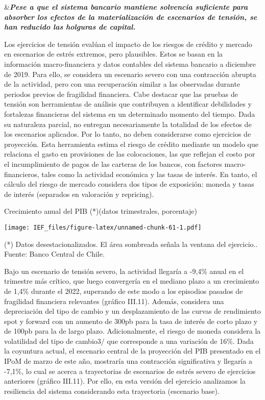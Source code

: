 \documentclass[
]{book}
\begin{document}
\&\textbf{\emph{Pese a que el sistema bancario mantiene solvencia suficiente para absorber los efectos de la materialización de escenarios de tensión, se han reducido las holguras de capital.}}

Los ejercicios de tensión evalúan el impacto de los riesgos de crédito y
mercado en escenarios de estrés extremos, pero plausibles. Estos se basan
en la información macro-financiera y datos contables del sistema bancario
a diciembre de 2019. Para ello, se considera un escenario severo con una
contracción abrupta de la actividad, pero con una recuperación similar a las
observadas durante periodos previos de fragilidad financiera.
Cabe destacar que las pruebas de tensión son herramientas de análisis que
contribuyen a identificar debilidades y fortalezas financieras del sistema en un
determinado momento del tiempo. Dada su naturaleza parcial, no entregan
necesariamente la totalidad de los efectos de los escenarios aplicados. Por lo
tanto, no deben considerarse como ejercicios de proyección. Esta herramienta
estima el riesgo de crédito mediante un modelo que relaciona el gasto en
provisiones de las colocaciones, las que reflejan el costo por el incumplimiento
de pagos de las carteras de los bancos, con factores macro-financieros, tales
como la actividad económica y las tasas de interés. En tanto, el cálculo del
riesgo de mercado considera dos tipos de exposición: moneda y tasas de interés
(separados en valoración y repricing).

Crecimiento anual del PIB (*)(datos trimestrales, porcentaje)

\texttt{[image: IEF\_files/figure-latex/unnamed-chunk-61-1.pdf]}

(*) Datos desestacionalizados. El área sombreada señala la ventana del ejercicio..
Fuente: Banco Central de Chile.

Bajo un escenario de tensión severo, la actividad llegaría a -9,4\% anual en
el trimestre más crítico, que luego convergería en el mediano plazo a un
crecimiento de 1,4\% durante el 2022, superando de este modo a los episodios
pasados de fragilidad financiera relevantes (gráfico III.11). Además, considera
una depreciación del tipo de cambio y un desplazamiento de las curvas de
rendimiento spot y forward con un aumento de 300pb para la tasa de interés
de corto plazo y de 100pb para la de largo plazo. Adicionalmente, el riesgo de
moneda considera la volatilidad del tipo de cambio3/ que corresponde a una variación de 16\%.
Dada la coyuntura actual, el escenario central de la proyección del PIB
presentado en el IPoM de marzo de este año, mostraría una contracción
significativa y llegaría a -7,1\%, lo cual se acerca a trayectorias de escenarios
de estrés severo de ejercicios anteriores (gráfico III.11). Por ello, en esta versión
del ejercicio analizamos la resiliencia del sistema considerando esta trayectoria
(escenario base).
\end{document}
